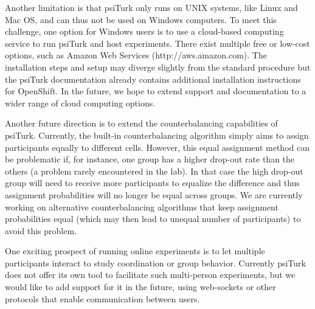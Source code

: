 \documentclass[twocolumn]{svjour3}          %
\newcommand{\psiturk}[0]{\textsf{psiTurk}}
\begin{document}
Another limitation is that \psiturk{} only runs on UNIX systems, like Linux and Mac OS, and can thus not be used on Windows computers. To meet this 
challenge, one option for Windows users is to use a cloud-based computing service to run \psiturk{} and host experiments. There exist
multiple free or low-cost options, such as Amazon Web Services (\textsf{http://aws.amazon.com}). 
The installation steps and setup may diverge slightly from the standard procedure but  the \psiturk{} documentation already contains 
additional installation instructions for OpenShift. In the future, we hope to extend support  and documentation to a wider range of cloud 
computing options.

Another future direction is to extend the counterbalancing capabilities of \psiturk{}. Currently, the built-in counterbalancing algorithm
simply aims to assign participants equally to different cells.  However, this equal assignment method can be problematic if, for instance, 
one group has a higher drop-out rate than the others (a problem rarely encountered in the lab). 
In that case the high drop-out group will need to receive
more participants to equalize the difference and thus assignment probabilities will no longer be equal across groups. We are
currently working on alternative counterbalancing algorithms that keep assignment probabilities equal (which may then lead to unequal
number of participants) to avoid this problem. 

One exciting prospect of running online experiments is to let multiple participants interact to study coordination
or group behavior. Currently \psiturk{} does not offer its own tool to facilitate such multi-person experiments, but we would like to
add support for it in the future, using web-sockets or other protocols that enable communication between users.





\end{document}
